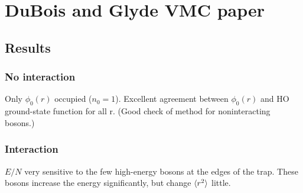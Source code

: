 \section*{DuBois and Glyde VMC paper}
\subsection*{Results}
\subsubsection*{No interaction}
Only $\phi_0(r)$ occupied ($n_0 = 1$). Excellent agreement between $\phi_0(r)$
and HO ground-state function for all r. (Good check of method for noninteracting bosons.)
\subsubsection*{Interaction}
$E/N$ very sensitive to the few high-energy bosons at the edges of the trap.
These bosons increase the energy significantly, but change $\langle r^2 \rangle$ little.

